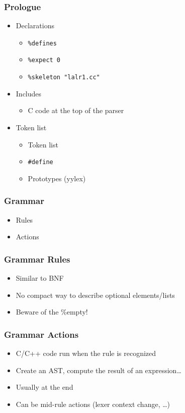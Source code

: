 \documentclass{beamer}
\begin{document}
\begin{frame}
  \frametitle{Prologue}
    \begin{itemize}[<+->]
      \item Declarations
      \begin{itemize}[<+->]
        \item \texttt{\%defines}
        \item \texttt{\%expect 0}
        \item \texttt{\%skeleton "lalr1.cc"}
      \end{itemize}
      \item Includes
      \begin{itemize}[<+->]
        \item C code at the top of the parser
      \end{itemize}
      \item Token list
      \begin{itemize}[<+->]
        \item Token list
        \item \texttt{\#define}
        \item Prototypes (yylex)
      \end{itemize}
  \end{itemize}
\end{frame}

\begin{frame}
  \frametitle{Grammar}
    \begin{itemize}[<+->]
      \item Rules
      \item Actions
    \end{itemize}
\end{frame}

\begin{frame}
  \frametitle{Grammar Rules}
    \begin{itemize}[<+->]
      \item Similar to BNF
      \item No compact way to describe optional elements/lists
      \item Beware of the \%empty!
    \end{itemize}
\end{frame}

\begin{frame}
  \frametitle{Grammar Actions}
    \begin{itemize}[<+->]
      \item C/C++ code run when the rule is recognized
      \item Create an AST, compute the result of an expression\ldots
      \item Usually at the end
      \item Can be mid-rule actions (lexer context change, \ldots)
    \end{itemize}
\end{frame}
\end{document}

